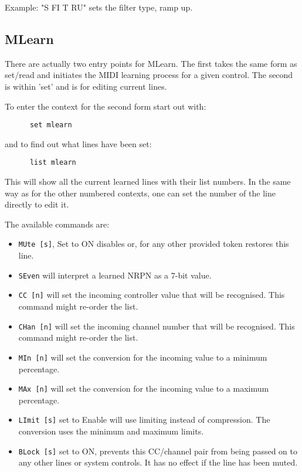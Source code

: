   Example: "S FI T RU" sets the filter type, ramp up.

\subsection{MLearn}
\label{subsec:command_line_mlearn}
   There are actually two entry points for MLearn. The first takes the same form
   as set/read and initiates the MIDI learning process for a given control.
   The second is within 'set' and is for editing current lines.

   To enter the context for the second form start out with:
   \begin{verbatim}
      set mlearn
   \end{verbatim}
   and to find out what lines have been set:
   \begin{verbatim}
      list mlearn
   \end{verbatim}
   This will show all the current learned lines with their list numbers.
   In the same way as for the other numbered contexts, one can set the number
   of the line directly to edit it.

   The available commands are:

   \begin{itemize}
      \item \texttt{MUte [s]}, Set to ON disables or, for any other provided token
         restores this line.
      \item \texttt{SEven} will interpret a learned NRPN as a 7-bit value.
      \item \texttt{CC [n]} will set the incoming controller value that will
         be recognised.  This command might re-order the list.
      \item \texttt{CHan [n]} will set the incoming channel number that will
         be recognised.  This command might re-order the list.
      \item \texttt{MIn [n]} will set the conversion for the incoming
         value to a minimum percentage.
      \item \texttt{MAx [n]} will set the conversion for the incoming
         value to a maximum percentage.
      \item \texttt{LImit [s]} set to Enable will use limiting instead of
         compression.  The conversion uses the minimum and maximum limits.
      \item \texttt{BLock [s]} set to ON, prevents this CC/channel pair from
        being passed on to any other lines or system controls.  It has no effect
        if the line has been muted.
   \end{itemize}

